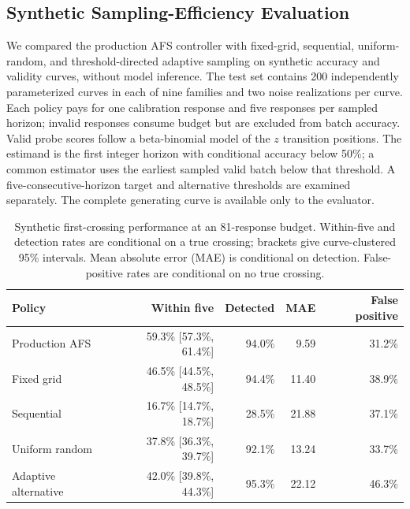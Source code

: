 \subsection{Synthetic Sampling-Efficiency Evaluation}
\label{app:afs_simulation}
We compared the production AFS controller with fixed-grid, sequential, uniform-random, and threshold-directed adaptive sampling on synthetic accuracy and validity curves, without model inference. The test set contains 200 independently parameterized curves in each of nine families and two noise realizations per curve. Each policy pays for one calibration response and five responses per sampled horizon; invalid responses consume budget but are excluded from batch accuracy. Valid probe scores follow a beta-binomial model of the $z$ transition positions. The estimand is the first integer horizon with conditional accuracy below 50\%; a common estimator uses the earliest sampled valid batch below that threshold. A five-consecutive-horizon target and alternative thresholds are examined separately. The complete generating curve is available only to the evaluator.

\begin{table}[H]
\centering
\caption{Synthetic first-crossing performance at an 81-response budget. Within-five and detection rates are conditional on a true crossing; brackets give curve-clustered 95\% intervals. Mean absolute error (MAE) is conditional on detection. False-positive rates are conditional on no true crossing.}
\label{tab:afs_simulation}
\scriptsize
\begin{tabular}{lrrrr}
\toprule
Policy & Within five & Detected & MAE & False positive \\
\midrule
Production AFS & 59.3\% [57.3\%, 61.4\%] & 94.0\% & 9.59 & 31.2\% \\
Fixed grid & 46.5\% [44.5\%, 48.5\%] & 94.4\% & 11.40 & 38.9\% \\
Sequential & 16.7\% [14.7\%, 18.7\%] & 28.5\% & 21.88 & 37.1\% \\
Uniform random & 37.8\% [36.3\%, 39.7\%] & 92.1\% & 13.24 & 33.7\% \\
Adaptive alternative & 42.0\% [39.8\%, 44.3\%] & 95.3\% & 22.12 & 46.3\% \\
\bottomrule
\end{tabular}
\end{table}


